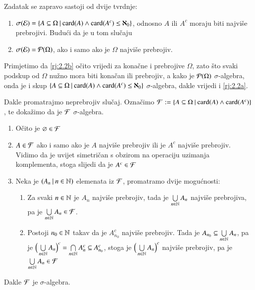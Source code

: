 \begin{rj}[\ref{zad:2.2}]
    Zadatak se zapravo sastoji od dvije tvrdnje:
    \begin{enumerate}[label=(\arabic*)]
        \item \label{rj:2.2a}
        $\sigma({\mathcal{E}}) = \{{A \subseteq \Omega} \: | \: {\textnormal{card}({A}) \land \textnormal{card}({A^c}) \leq \aleph_0}\}$, odnosno $A$ ili $A^c$ moraju biti najvi\v se prebrojivi. Budu\' ci da je u tom slu\v caju
        \item   \label{rj:2.2b}
        $\sigma({\mathcal{E}}) = \mathcal{P}({\Omega})$, ako i samo ako je $\Omega$ najvi\v se prebrojiv.
    \end{enumerate}
    Primjetimo da \ref{rj:2.2b} o\v cito vrijedi za kona\v cne i prebrojive $\Omega$, zato \v sto svaki podskup od $\Omega$ nu\v zno mora biti kona\v can ili prebrojiv, a kako je $\mathcal{P}({\Omega})$ $\sigma$-algebra, onda je i skup $\{{A \subseteq \Omega} \: | \: {\textnormal{card}({A}) \land \textnormal{card}({A^c}) \leq \aleph_0}\}$ $\sigma$-algebra, dakle vrijedi i \ref{rj:2.2a}.

    Dakle promatrajmo neprebrojiv slu\v caj.
    Ozna\v cimo $\mathcal{F} := \{{A \subseteq \Omega} \: | \: {\textnormal{card}({A}) \land \textnormal{card}({A^c})}\}$, te doka\v zimo da je $\mathcal{F}$ $\sigma$-algebra.
    \begin{enumerate}[label=(\roman*)]
        \item O\v cito je $\varnothing \in \mathcal{F}$
        \item $A \in \mathcal{F}$ ako i samo ako je $A$ najvi\v se prebrojiv ili je $A^c$ najvi\v se prebrojiv.
        Vidimo da je uvijet simetri\v can s obzirom na operaciju uzimanja komplementa, stoga slijedi da je $A^c \in \mathcal{F}$
        \item Neka je $({A_n} \: | \: {n \in \mathbb{N}})$ elemenata iz $\mathcal{F}$, promatramo dvije mogu\' cnosti:
        \begin{enumerate}[label=\arabic*$\degree$)]
            \item Za svaki $n \in \mathbb{N}$ je $A_n$ najvi\v se prebrojiv, tada je $\bigcup\limits_{n \in \mathbb{N}}^{} A_n$ najvi\v se prebrojiva, pa je $\bigcup\limits_{n \in \mathbb{N}}^{} A_n \in \mathcal{F}$.
            \item Postoji $n_0 \in \mathbb{N}$ takav da je $A_{n_0}^c$ najvi\v se prebrojiv.
            Tada je $A_{n_0} \subseteq \bigcup\limits_{n \in \mathbb{N}}^{} A_n$, pa je $\Big( \bigcup\limits_{n \in \mathbb{N}}^{} A_n \Big)^c = \bigcap\limits_{n \in \mathbb{N}}^{} A_n^c \subseteq A_{n_0}^c$, stoga je $\Big( \bigcup\limits_{n \in \mathbb{N}}^{} A_n \Big)^c$ najvi\v se prebrojiv, pa je $\bigcup\limits_{n \in \mathbb{N}}^{} A_n \in \mathcal{F}$
        \end{enumerate}
    \end{enumerate}
    Dakle $\mathcal{F}$ je $\sigma$-algebra.


\end{rj}
